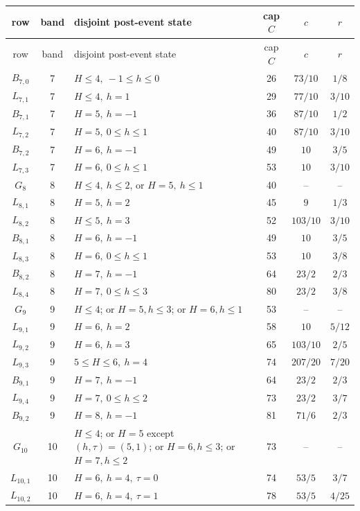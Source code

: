 \documentclass[11pt]{article}
\begin{document}
\begingroup
\scriptsize
\renewcommand{\arraystretch}{1.12}
\begin{longtable}{@{}c c L{6.0cm} c c c@{}}
\toprule
row&band&disjoint post-event state&cap \(C\)&\(c\)&\(r\)\\
\midrule
\endfirsthead
\toprule
row&band&disjoint post-event state&cap \(C\)&\(c\)&\(r\)\\
\midrule
\endhead
\(B_{7,0}\)&7&\(H\leq4,\ -1\leq h\leq0\)&26&\(73/10\)&\(1/8\)\\
\(L_{7,1}\)&7&\(H\leq4,\ h=1\)&29&\(77/10\)&\(3/10\)\\
\(B_{7,1}\)&7&\(H=5,\ h=-1\)&36&\(87/10\)&\(1/2\)\\
\(L_{7,2}\)&7&\(H=5,\ 0\leq h\leq1\)&40&\(87/10\)&\(3/10\)\\
\(B_{7,2}\)&7&\(H=6,\ h=-1\)&49&\(10\)&\(3/5\)\\
\(L_{7,3}\)&7&\(H=6,\ 0\leq h\leq1\)&53&\(10\)&\(3/10\)\\ \midrule
\(G_8\)&8&\(H\leq4,\ h\leq2\), or \(H=5,\ h\leq1\)&40&--&--\\
\(L_{8,1}\)&8&\(H=5,\ h=2\)&45&\(9\)&\(1/3\)\\
\(L_{8,2}\)&8&\(H\leq5,\ h=3\)&52&\(103/10\)&\(3/10\)\\
\(B_{8,1}\)&8&\(H=6,\ h=-1\)&49&\(10\)&\(3/5\)\\
\(L_{8,3}\)&8&\(H=6,\ 0\leq h\leq1\)&53&\(10\)&\(3/8\)\\
\(B_{8,2}\)&8&\(H=7,\ h=-1\)&64&\(23/2\)&\(2/3\)\\
\(L_{8,4}\)&8&\(H=7,\ 0\leq h\leq3\)&80&\(23/2\)&\(3/8\)\\ \midrule
\(G_9\)&9&\(H\leq4\); or \(H=5,h\leq3\); or \(H=6,h\leq1\)&53&--&--\\
\(L_{9,1}\)&9&\(H=6,\ h=2\)&58&\(10\)&\(5/12\)\\
\(L_{9,2}\)&9&\(H=6,\ h=3\)&65&\(103/10\)&\(2/5\)\\
\(L_{9,3}\)&9&\(5\leq H\leq6,\ h=4\)&74&\(207/20\)&\(7/20\)\\
\(B_{9,1}\)&9&\(H=7,\ h=-1\)&64&\(23/2\)&\(2/3\)\\
\(L_{9,4}\)&9&\(H=7,\ 0\leq h\leq2\)&73&\(23/2\)&\(3/7\)\\
\(B_{9,2}\)&9&\(H=8,\ h=-1\)&81&\(71/6\)&\(2/3\)\\ \midrule
\(G_{10}\)&10&\(H\leq4\); or \(H=5\) except \((h,\tau)=(5,1)\); or
\(H=6,h\leq3\); or \(H=7,h\leq2\)&73&--&--\\
\(L_{10,1}\)&10&\(H=6,\ h=4,\ \tau=0\)&74&\(53/5\)&\(3/7\)\\
\(L_{10,2}\)&10&\(H=6,\ h=4,\ \tau=1\)&78&\(53/5\)&\(4/25\)\\

\end{longtable}
\end{document}
